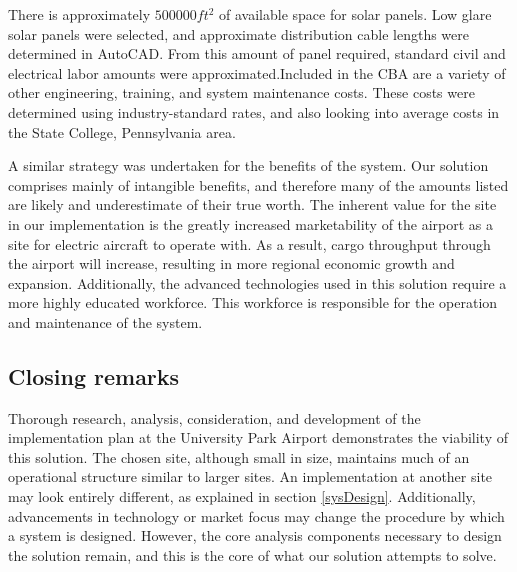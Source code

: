 \documentclass[../main.tex]{subfiles}
\begin{document}
\FloatBarrier
There is approximately $500000ft^{2}$ of available space for solar panels. Low glare solar panels were selected, and approximate distribution cable lengths were determined in AutoCAD. From this amount of panel required, standard civil and electrical labor amounts were approximated.Included in the CBA are a variety of other engineering, training, and system maintenance costs. These costs were determined using industry-standard rates, and also looking into average costs in the State College, Pennsylvania area. \par
A similar strategy was undertaken for the benefits of the system. Our solution comprises mainly of intangible benefits, and therefore many of the amounts listed are likely and underestimate of their true worth. The inherent value for the site in our implementation is the greatly increased marketability of the airport as a site for electric aircraft to operate with. As a result, cargo throughput through the airport will increase, resulting in more regional economic growth and expansion. Additionally, the advanced technologies used in this solution require a more highly educated workforce. This workforce is responsible for the operation and maintenance of the system.\par
\subsection*{Closing remarks}
Thorough research, analysis, consideration, and development of the implementation plan at the University Park Airport demonstrates the viability of this solution. The chosen site, although small in size, maintains much of an operational structure similar to larger sites. An implementation at another site may look entirely different, as explained in section \ref{sysDesign}. Additionally, advancements in technology or market focus may change the procedure by which a system is designed. However, the core analysis components necessary to design the solution remain, and this is the core of what our solution attempts to solve.\par
\end{document}
